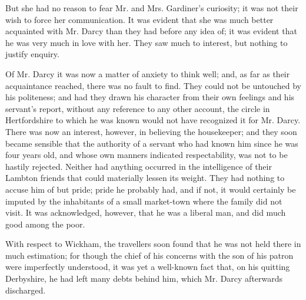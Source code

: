 But she had no reason to fear Mr. and Mrs. Gardiner's curiosity; it was not their wish to force her communication. It was evident that she was much better acquainted with Mr. Darcy than they had before any idea of; it was evident that he was very much in love with her. They saw much to interest, but nothing to justify enquiry.

Of Mr. Darcy it was now a matter of anxiety to think well; and, as far as their acquaintance reached, there was no fault to find. They could not be untouched by his politeness; and had they drawn his character from their own feelings and his servant's report, without any reference to any other account, the circle in Hertfordshire to which he was known would not have recognized it for Mr. Darcy. There was now an interest, however, in believing the housekeeper; and they soon became sensible that the authority of a servant who had known him since he was four years old, and whose own manners indicated respectability, was not to be hastily rejected. Neither had anything occurred in the intelligence of their Lambton friends that could materially lessen its weight. They had nothing to accuse him of but pride; pride he probably had, and if not, it would certainly be imputed by the inhabitants of a small market-town where the family did not visit. It was acknowledged, however, that he was a liberal man, and did much good among the poor.

With respect to Wickham, the travellers soon found that he was not held there in much estimation; for though the chief of his concerns with the son of his patron were imperfectly understood, it was yet a well-known fact that, on his quitting Derbyshire, he had left many debts behind him, which Mr. Darcy afterwards discharged.


